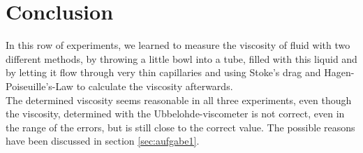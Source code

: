 \section{Conclusion}
In this row of experiments, we learned to measure the viscosity of fluid with two different methods, by throwing a little bowl into a tube, filled with this liquid and by letting it flow through very thin capillaries and using Stoke's drag and Hagen-Poiseuille's-Law to calculate the viscosity afterwards.\\
The determined viscosity seems reasonable in all three experiments, even though the viscosity, determined with the Ubbelohde-viscometer is not correct, even in the range of the errors, but is still close to the correct value. The possible reasons have been discussed in section \ref{sec:aufgabe1}.